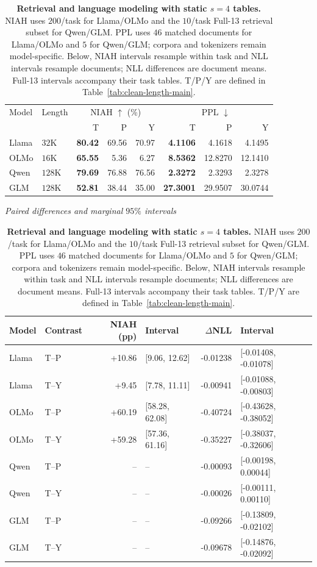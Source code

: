 \begin{table}[ht]
\centering\small
\caption{\textbf{Retrieval and language modeling with static $s=4$ tables.} NIAH uses $200$/task for Llama/OLMo and the $10$/task Full-13 retrieval subset for Qwen/GLM. PPL uses $46$ matched documents for Llama/OLMo and $5$ for Qwen/GLM; corpora and tokenizers remain model-specific. Below, NIAH intervals resample within task and NLL intervals resample documents; NLL differences are document means. Full-13 intervals accompany their task tables. T/P/Y are defined in Table~\ref{tab:clean-length-main}.}
\label{tab:three-method-main}\label{tab:three-method-intervals}
\begin{tabular}{@{}llrrrrrr@{}}
\toprule
Model & Length & \multicolumn{3}{c}{NIAH $\uparrow$ (\%)} & \multicolumn{3}{c}{PPL $\downarrow$} \\
 & & T & P & Y & T & P & Y \\
\midrule
Llama & $32$K & \textbf{80.42} & 69.56 & 70.97 & \textbf{4.1106} & 4.1618 & 4.1495 \\
OLMo & $16$K & \textbf{65.55} & 5.36 & 6.27 & \textbf{8.5362} & 12.8270 & 12.1410 \\
Qwen & $128$K & \textbf{79.69} & 76.88 & 76.56 & \textbf{2.3272} & 2.3293 & 2.3278 \\
GLM & $128$K & \textbf{52.81} & 38.44 & 35.00 & \textbf{27.3001} & 29.9507 & 30.0744 \\
\bottomrule
\end{tabular}
\par\medskip\textit{Paired differences and marginal $95\%$ intervals}\par\smallskip
\begin{tabular}{@{}llrlrl@{}}
\toprule
Model & Contrast & NIAH (pp) & Interval & $\Delta$NLL & Interval \\
\midrule
Llama & T--P & +10.86 & [9.06, 12.62] & -0.01238 & [-0.01408, -0.01078] \\
Llama & T--Y & +9.45 & [7.78, 11.11] & -0.00941 & [-0.01088, -0.00803] \\
OLMo & T--P & +60.19 & [58.28, 62.08] & -0.40724 & [-0.43628, -0.38052] \\
OLMo & T--Y & +59.28 & [57.36, 61.16] & -0.35227 & [-0.38037, -0.32606] \\
Qwen & T--P & -- & -- & -0.00093 & [-0.00198, 0.00044] \\
Qwen & T--Y & -- & -- & -0.00026 & [-0.00111, 0.00110] \\
GLM & T--P & -- & -- & -0.09266 & [-0.13809, -0.02102] \\
GLM & T--Y & -- & -- & -0.09678 & [-0.14876, -0.02092] \\
\bottomrule
\end{tabular}
\end{table}
